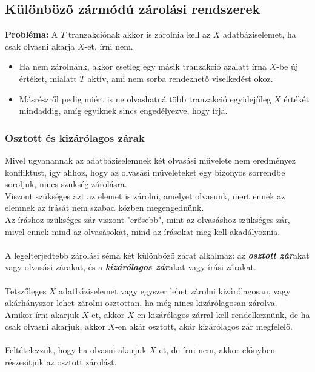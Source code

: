\documentclass[12pt,margin=0px]{article}
\begin{document}
	\subsection*{Különböző zármódú zárolási rendszerek}
	
    \textbf{Probléma:} A $T$ tranzakciónak akkor is zárolnia kell az $X$ adatbáziselemet, ha csak olvasni akarja $X$-et, írni nem.
    \begin{itemize}
        \item Ha nem zárolnánk, akkor esetleg egy másik tranzakció azalatt írna $X$-be új értéket, mialatt $T$ aktív, ami nem sorba rendezhető viselkedést okoz.
        \item Másrészről pedig miért is ne olvashatná több tranzakció egyidejűleg $X$ értékét mindaddig, amíg egyiknek sincs engedélyezve, hogy írja.
    \end{itemize}

    \subsubsection*{Osztott és kizárólagos zárak}
    Mivel ugyanannak az adatbáziselemnek két olvasási művelete nem eredményez konfliktust, így ahhoz, hogy az olvasási műveleteket egy bizonyos sorrendbe soroljuk, nincs szükség zárolásra. \\
    Viszont szükséges azt az elemet is zárolni, amelyet olvasunk, mert ennek az elemnek az írását nem szabad közben megengednünk.\\
    Az íráshoz szükséges zár viszont "erősebb", mint az olvasáshoz szükséges zár, mivel ennek mind az olvasásokat, mind az írásokat meg kell akadályoznia. \\\\
    A legelterjedtebb zárolási séma két különböző zárat alkalmaz: az \emph{\textbf{osztott zár}}akat vagy olvasási zárakat, és a \emph{\textbf{kizárólagos zár}}akat vagy írási zárakat. \\\\
    Tetszőleges $X$ adatbáziselemet vagy egyszer lehet zárolni kizárólagosan, vagy akárhányszor lehet zárolni osztottan, ha még nincs kizárólagosan zárolva. \\
    Amikor írni akarjuk $X$-et, akkor $X$-en kizárólagos zárral kell rendelkeznünk, de ha csak olvasni akarjuk, akkor $X$-en akár osztott, akár kizárólagos zár megfelelő. \\\\
    Feltételezzük, hogy ha olvasni akarjuk $X$-et, de írni nem, akkor előnyben részesítjük az osztott zárolást.
\end{document}
